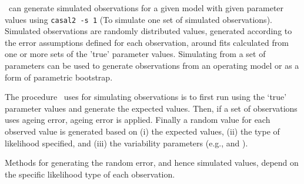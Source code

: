 \CNAME\ can generate simulated observations for a given model with given parameter values using \texttt{casal2 -s 1} (To simulate one set of simulated observations). Simulated observations are randomly distributed values, generated according to the error assumptions defined for each observation, around fits calculated from one or more sets of the 'true' parameter values. Simulating from a set of parameters can be used to generate observations from an operating model or as a form of parametric bootstrap. 

The procedure \CNAME\ uses for simulating observations is to first run using the `true' parameter values and generate the expected values. Then, if a set of observations uses ageing error, ageing error is applied. Finally a random value for each observed value is generated based on (i) the expected values, (ii) the type of likelihood specified, and (iii) the variability parameters (e.g.,  and ). 

Methods for generating the random error, and hence simulated values, depend on the specific likelihood type of each observation. 

